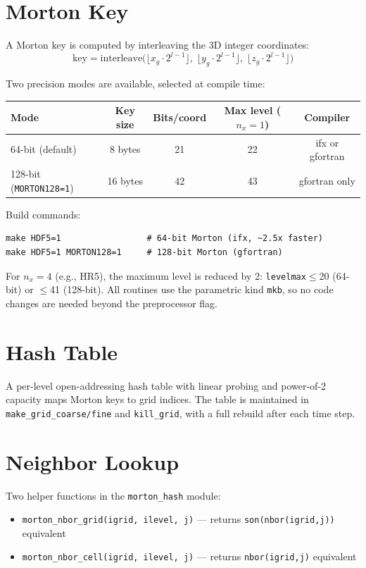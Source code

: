 \documentclass[11pt,fleqn]{book}
\begin{document}
\section{Morton Key}

A Morton key is computed by interleaving the 3D integer coordinates:
\[
\text{key} = \text{interleave}\bigl(\lfloor x_g \cdot 2^{l-1} \rfloor,\; \lfloor y_g \cdot 2^{l-1} \rfloor,\; \lfloor z_g \cdot 2^{l-1} \rfloor\bigr)
\]

Two precision modes are available, selected at compile time:

\begin{center}
\begin{tabular}{lcccc}
\hline
Mode & Key size & Bits/coord & Max level ($n_x=1$) & Compiler \\
\hline
64-bit (default) & 8 bytes & 21 & 22 & ifx or gfortran \\
128-bit (\texttt{MORTON128=1}) & 16 bytes & 42 & 43 & gfortran only \\
\hline
\end{tabular}
\end{center}

\noindent Build commands:
\begin{verbatim}
make HDF5=1                 # 64-bit Morton (ifx, ~2.5x faster)
make HDF5=1 MORTON128=1     # 128-bit Morton (gfortran)
\end{verbatim}

\noindent For $n_x=4$ (e.g., HR5), the maximum level is reduced by 2: \texttt{levelmax}$\le$20 (64-bit) or $\le$41 (128-bit). All routines use the parametric kind \texttt{mkb}, so no code changes are needed beyond the preprocessor flag.

\section{Hash Table}

A per-level open-addressing hash table with linear probing and power-of-2 capacity maps Morton keys to grid indices. The table is maintained in \texttt{make\_grid\_coarse/fine} and \texttt{kill\_grid}, with a full rebuild after each time step.

\section{Neighbor Lookup}

Two helper functions in the \texttt{morton\_hash} module:
\begin{itemize}[leftmargin=2em]
  \item \texttt{morton\_nbor\_grid(igrid, ilevel, j)} --- returns \texttt{son(nbor(igrid,j))} equivalent
  \item \texttt{morton\_nbor\_cell(igrid, ilevel, j)} --- returns \texttt{nbor(igrid,j)} equivalent
\end{itemize}
\end{document}
